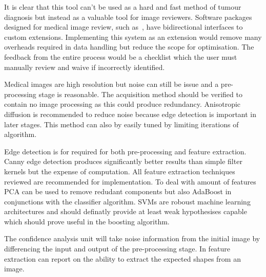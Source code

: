 \documentclass[journal]{IEEEtran}
\begin{document}
It is clear that this tool can't be used as a hard and fast method of tumour diagnosis but instead as a valuable tool for image reviewers.
Software packages designed for medical image review, such as~\cite{slicer}, have bidirectional interfaces to custom extensions.
Implementing this system as an extension would remove many overheads required in data handling but reduce the scope for optimisation.
The feedback from the entire process would be a checklist which the user must manually review and waive if incorrectly identified.

Medical images are high resolution but noise can still be issue and a pre-processing stage is reasonable.
The acquisition method should be verified to contain no image processing as this could produce redundancy.
Anisotropic diffusion is recommended to reduce noise because edge detection is important in later stages.
This method can also by easily tuned by limiting iterations of algorithm.

Edge detection is for required for both pre-processing and feature extraction.
Canny edge detection produces significantly better results than simple filter kernels but the expense of computation.
All feature extraction techniques reviewed are recommended for implementation.
To deal with amount of features PCA can be used to remove redudant components but also AdaBoost in conjunctions with the classifier algorithm.
SVMs are roboust machine learning architectures and should definatly provide at least weak hypothesises capable which should prove useful in the boosting algorithm. 


The confidence analysis unit will take noise information from the initial image by differencing the input and output of the pre-processing stage.
In feature extraction can report on the ability to extract the expected shapes from an image. 










\end{document}
